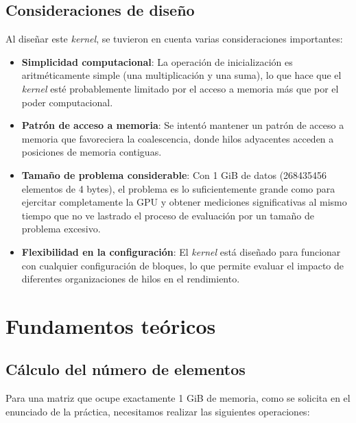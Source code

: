     \subsection{Consideraciones de diseño}
    
        Al diseñar este \textit{kernel}, se tuvieron en cuenta varias consideraciones importantes:

        \begin{itemize}
        
            \item \textbf{Simplicidad computacional}: La operación de inicialización es aritméticamente simple (una multiplicación y una suma), lo que hace que el \textit{kernel} esté probablemente limitado por el acceso a memoria más que por el poder computacional.
            
            \item \textbf{Patrón de acceso a memoria}: Se intentó mantener un patrón de acceso a memoria que favoreciera la coalescencia, donde hilos adyacentes acceden a posiciones de memoria contiguas.
            
            \item \textbf{Tamaño de problema considerable}: Con 1 GiB de datos (268435456 elementos de 4 bytes), el problema es lo suficientemente grande como para ejercitar completamente la GPU y obtener mediciones significativas al mismo tiempo que no ve lastrado el proceso de evaluación por un tamaño de problema excesivo.
            
            \item \textbf{Flexibilidad en la configuración}: El \textit{kernel} está diseñado para funcionar con cualquier configuración de bloques, lo que permite evaluar el impacto de diferentes organizaciones de hilos en el rendimiento.
            
        \end{itemize}

\newpage

\section{Fundamentos teóricos}

    \subsection{Cálculo del número de elementos}

        Para una matriz que ocupe exactamente 1 GiB de memoria, como se solicita en el enunciado de la práctica, necesitamos realizar las siguientes operaciones:
        
